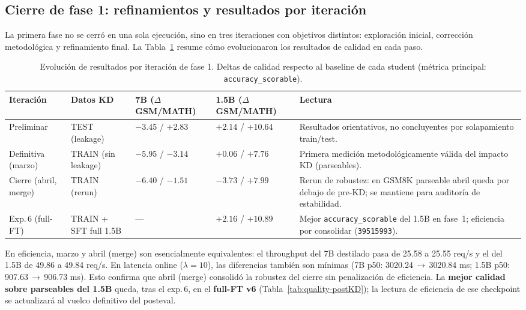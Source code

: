 \documentclass[11pt,a4paper]{article}
\begin{document}
\subsection{Cierre de fase 1: refinamientos y resultados por iteraci\'on}

La primera fase no se cerr\'o en una sola ejecuci\'on, sino en tres
iteraciones con objetivos distintos: exploraci\'on inicial,
correcci\'on metodol\'ogica y refinamiento final. La
Tabla~\ref{tab:iteration-refinement} resume c\'omo evolucionaron los
resultados de calidad en cada paso.

\begin{table}[H]
\centering
\caption{Evoluci\'on de resultados por iteraci\'on de fase 1.
         Deltas de calidad respecto al baseline de cada student
         (m\'etrica principal: \texttt{accuracy\_scorable}).}
\label{tab:iteration-refinement}
\begin{adjustbox}{max width=\textwidth}
\begin{tabular}{@{}p{2.8cm}p{2.2cm}p{2.7cm}p{2.7cm}p{3.8cm}@{}}
\toprule
\textbf{Iteraci\'on} & \textbf{Datos KD} & \textbf{7B ($\Delta$ GSM/MATH)} & \textbf{1.5B ($\Delta$ GSM/MATH)} & \textbf{Lectura} \\
\midrule
Preliminar & TEST (leakage) & $-3.45$ / $+2.83$ & $+2.14$ / $+10.64$ & Resultados orientativos, no concluyentes por solapamiento train/test. \\
Definitiva (marzo) & TRAIN (sin leakage) & $-5.95$ / $-3.14$ & $+0.06$ / $+7.76$ & Primera medici\'on metodol\'ogicamente v\'alida del impacto KD (parseables). \\
Cierre (abril, merge) & TRAIN (rerun) & $-6.40$ / $-1.51$ & $-3.73$ / $+7.99$ & Rerun de robustez: en GSM8K parseable abril queda por debajo de pre-KD; se mantiene para auditor\'ia de estabilidad. \\
Exp.\,6 (full-FT) & TRAIN + SFT full 1.5B & --- & $\mathbf{+2.16}$ / $\mathbf{+10.89}$ & Mejor \texttt{accuracy\_scorable} del 1.5B en fase~1; eficiencia por consolidar (\texttt{39515993}). \\
\bottomrule
\end{tabular}
\end{adjustbox}
\end{table}

En eficiencia, marzo y abril (merge) son esencialmente equivalentes: el
throughput del 7B destilado pasa de 25.58 a 25.55 req/s y el del 1.5B
de 49.86 a 49.84 req/s. En latencia online ($\lambda=10$), las
diferencias tambi\'en son m\'inimas (7B p50: 3020.24\,$\to$\,3020.84 ms;
1.5B p50: 907.63\,$\to$\,906.73 ms). Esto confirma que abril (merge)
consolid\'o la robustez del cierre sin penalizaci\'on de eficiencia.
La \textbf{mejor calidad sobre parseables del 1.5B} queda, tras el exp.\,6, en el
\textbf{full-FT v6} (Tabla~\ref{tab:quality-postKD}); la lectura de
eficiencia de ese checkpoint se actualizar\'a al vuelco definitivo del
posteval.
\end{document}
